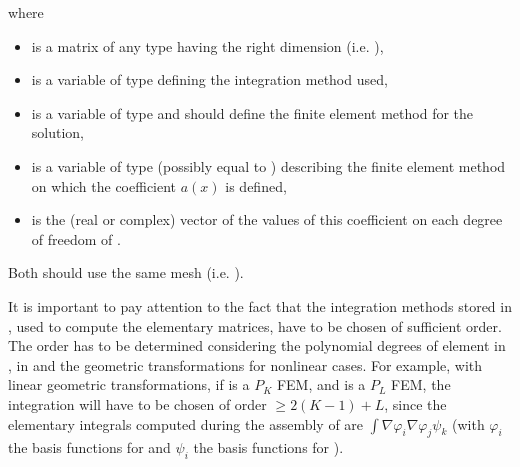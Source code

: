 \documentclass[a4paper,11pt,english]{sphinxmanual}
\begin{document}
where
\begin{itemize}
\item {} 
 is a matrix of any type having the right dimension (i.e.
),

\item {} 
 is a variable of type  defining the integration method used,

\item {} 
 is a variable of type  and should define the finite element
method for the solution,

\item {} 
 is a variable of type  (possibly equal to ) describing the
finite element method on which the coefficient \(a(x)\) is defined,

\item {} 
 is the (real or complex) vector of the values of this coefficient on each
degree of freedom of .

\end{itemize}

Both  should use the same mesh (i.e. ).

It is important to pay attention to the fact that the integration methods stored
in , used to compute the elementary matrices, have to be chosen of
sufficient order. The order has to be determined considering the polynomial
degrees of element in , in  and the geometric transformations for
non\sphinxhyphen{}linear cases. For example, with linear geometric transformations, if 
is a \(P_{K}\) FEM, and  is a \(P_{L}\) FEM, the integration will
have to be chosen of order \(\geq 2(K-1) + L\), since the elementary integrals
computed during the assembly of  are
\(\int\nabla\varphi_i\nabla\varphi_j\psi_k\) (with \(\varphi_i\) the basis
functions for  and \(\psi_i\) the basis functions for ).
\end{document}
